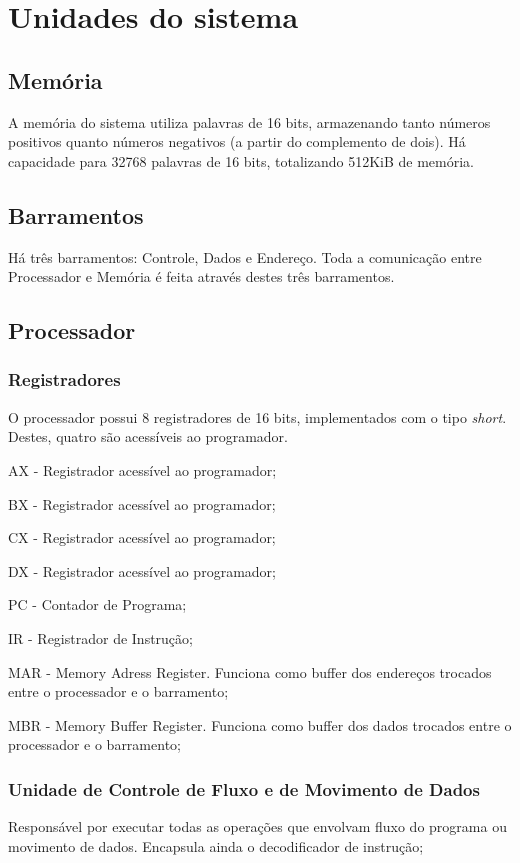 \documentclass[
	12pt,				%
	oneside,			%
	a4paper,			%
	english,			%
	french,				%
	spanish,			%
	brazil,				%
	]{abntex2}
\begin{document}
{\section{Unidades do sistema}

	\subsection{Memória}
	A memória do sistema utiliza palavras de 16 bits, armazenando tanto números
	positivos quanto números negativos (a partir do complemento de dois). Há
	capacidade para 32768 palavras de 16 bits, totalizando 512KiB de memória.

	\subsection{Barramentos}
	Há três barramentos: Controle, Dados e Endereço. Toda a comunicação entre
	Processador e Memória é feita através destes três barramentos.

	\subsection{Processador}
		\subsubsection{Registradores}
		O processador possui 8 registradores de 16 bits, implementados com o
		tipo \textit{short}. Destes, quatro são acessíveis ao programador.
		\begin{alineas}
			\item
				AX - Registrador acessível ao programador;
			\item
				BX - Registrador acessível ao programador;
			\item
				CX - Registrador acessível ao programador;
			\item
				DX - Registrador acessível ao programador;
			\item
				PC - Contador de Programa;
			\item
				IR - Registrador de Instrução;
			\item
				MAR - Memory Adress Register. Funciona como buffer dos
				endereços trocados entre o processador e o barramento;
			\item
				MBR - Memory Buffer Register. Funciona como buffer dos
				dados trocados entre o processador e o barramento;
		\end{alineas}

		\subsubsection{Unidade de Controle de Fluxo e de Movimento de Dados}
		Responsável por executar todas as operações que envolvam fluxo do
		programa ou movimento de dados. Encapsula ainda o decodificador de
		instrução;
}
\end{document}
